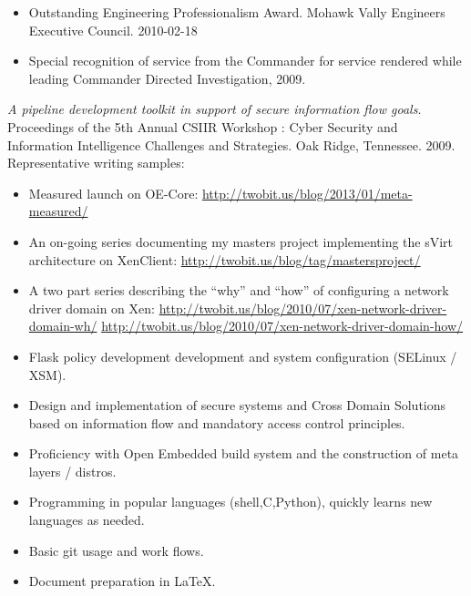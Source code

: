 \documentclass[letterpaper,11pt]{article}
\begin{document}
    \begin {itemize}
      \setlength {\itemsep}{1pt}
      \setlength {\parskip}{0pt}
      \setlength {\parsep}{0pt}
    \item Outstanding Engineering Professionalism Award.
      Mohawk Vally Engineers Executive Council.
      2010-02-18
    \item Special recognition of service from the Commander for service rendered while leading Commander Directed Investigation, 2009.
    \end {itemize}

    {\it A pipeline development toolkit in support of secure information flow goals}.
    Proceedings of the 5th Annual CSIIR Workshop : Cyber Security and Information Intelligence Challenges and Strategies.
    Oak Ridge, Tennessee.
    2009.\\
    Representative writing samples:
    \begin {itemize}
      \setlength {\itemsep}{1pt}
      \setlength {\parskip}{0pt}
      \setlength {\parsep}{0pt}
    \item
      Measured launch on OE-Core:
      \url {http://twobit.us/blog/2013/01/meta-measured/}
    \item
      An on-going series documenting my masters project implementing the sVirt architecture on XenClient:
      \url {http://twobit.us/blog/tag/mastersproject/}
    \item
      A two part series describing the ``why'' and ``how'' of configuring a network driver domain on Xen:
      \url {http://twobit.us/blog/2010/07/xen-network-driver-domain-wh/}
      \url {http://twobit.us/blog/2010/07/xen-network-driver-domain-how/}
    \end {itemize}
    \begin {itemize}
      \setlength {\itemsep}{1pt}
      \setlength {\parskip}{0pt}
      \setlength {\parsep}{0pt}
      \item Flask policy development development and system configuration (SELinux / XSM).
      \item Design and implementation of secure systems and Cross Domain Solutions based on information flow and mandatory access control principles.
      \item Proficiency with Open Embedded build system and the construction of meta layers / distros.
      \item Programming in popular languages (shell,C,Python), quickly learns new languages as needed.
      \item Basic git usage and work flows.
      \item Document preparation in \LaTeX.
    \end {itemize}
\end{document}
